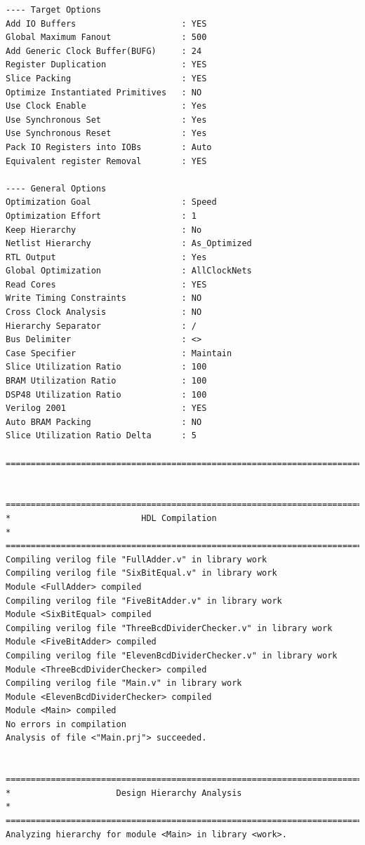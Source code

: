 \documentclass[fleqn]{article}
\begin{document}
\begin{latin}
\begin{lstlisting}[basicstyle=\tiny]
---- Target Options
Add IO Buffers                     : YES
Global Maximum Fanout              : 500
Add Generic Clock Buffer(BUFG)     : 24
Register Duplication               : YES
Slice Packing                      : YES
Optimize Instantiated Primitives   : NO
Use Clock Enable                   : Yes
Use Synchronous Set                : Yes
Use Synchronous Reset              : Yes
Pack IO Registers into IOBs        : Auto
Equivalent register Removal        : YES

---- General Options
Optimization Goal                  : Speed
Optimization Effort                : 1
Keep Hierarchy                     : No
Netlist Hierarchy                  : As_Optimized
RTL Output                         : Yes
Global Optimization                : AllClockNets
Read Cores                         : YES
Write Timing Constraints           : NO
Cross Clock Analysis               : NO
Hierarchy Separator                : /
Bus Delimiter                      : <>
Case Specifier                     : Maintain
Slice Utilization Ratio            : 100
BRAM Utilization Ratio             : 100
DSP48 Utilization Ratio            : 100
Verilog 2001                       : YES
Auto BRAM Packing                  : NO
Slice Utilization Ratio Delta      : 5

=========================================================================


=========================================================================
*                          HDL Compilation                              *
=========================================================================
Compiling verilog file "FullAdder.v" in library work
Compiling verilog file "SixBitEqual.v" in library work
Module <FullAdder> compiled
Compiling verilog file "FiveBitAdder.v" in library work
Module <SixBitEqual> compiled
Compiling verilog file "ThreeBcdDividerChecker.v" in library work
Module <FiveBitAdder> compiled
Compiling verilog file "ElevenBcdDividerChecker.v" in library work
Module <ThreeBcdDividerChecker> compiled
Compiling verilog file "Main.v" in library work
Module <ElevenBcdDividerChecker> compiled
Module <Main> compiled
No errors in compilation
Analysis of file <"Main.prj"> succeeded.


=========================================================================
*                     Design Hierarchy Analysis                         *
=========================================================================
Analyzing hierarchy for module <Main> in library <work>.


\end{lstlisting}
\end{latin}
\end{document}
